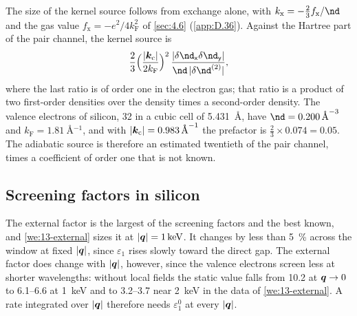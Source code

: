 The size of the kernel source follows from exchange alone, with $k_{\mathrm{x}} = -\frac23 f_{\mathrm{x}}/\nd$ and the gas value $f_{\mathrm{x}} = -e^2/4k_{\mathrm{F}}^2$ of \cref{sec:4.6} (\cref{app:D.36}). Against the Hartree part of the pair channel, the kernel source is
\begin{equation*}
  \frac23\Bigl(\frac{|\vect{k}_{\mathrm{c}}|}{2k_{\mathrm{F}}}\Bigr)^2\,\frac{|\delta\nd_{\mathsf{x}}\delta\nd_{\mathsf{y}}|}{\nd\,|\delta\nd^{(2)}|} ,
\end{equation*}
where the last ratio is of order one in the electron gas; that ratio is a product of two first-order densities over the density times a second-order density. The valence electrons of silicon, 32 in a cubic cell of \SI{5.431}{\angstrom}, have $\nd = \SI{0.200}{\angstrom^{-3}}$ and $k_{\mathrm{F}} = \SI{1.81}{\angstrom^{-1}}$, and with $|\bm{k}_{\mathrm{c}}| = \SI{0.983}{\angstrom^{-1}}$ the prefactor is $\frac23\times0.074 = 0.05$. The adiabatic source is therefore an estimated twentieth of the pair channel, times a coefficient of order one that is not known.

\subsection{Screening factors in silicon}

The external factor is the largest of the screening factors and the best known, and \cref{we:13-external} sizes it at $|\bm{q}| = \SI{1}{keV}$. It changes by less than \SI{5}{\percent} across the window at fixed $|\bm{q}|$, since $\varepsilon_1$ rises slowly toward the direct gap. The external factor does change with $|\bm{q}|$, however, since the valence electrons screen less at shorter wavelengths: without local fields the static value falls from 10.2 at $\bm{q} \to 0$ to 6.1--6.6 at \SI{1}{keV} and to 3.2--3.7 near \SI{2}{keV} in the data of \cref{we:13-external}. A rate integrated over $|\bm{q}|$ therefore needs $\varepsilon_1^0$ at every $|\bm{q}|$.

